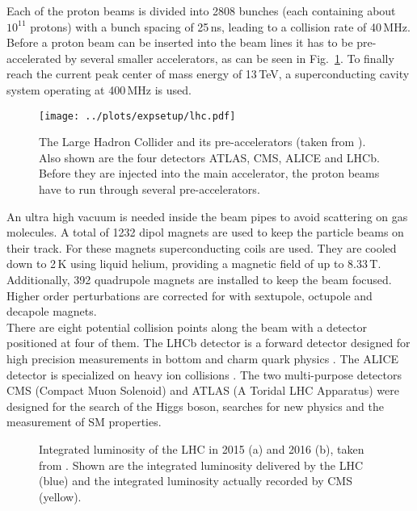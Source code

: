 \noindent Each of the proton beams is divided into 2808 bunches (each containing about $10^{11}$ protons) with a bunch spacing of 25\,ns, leading to a collision rate of 40\,MHz. Before a proton beam can be inserted into the beam lines it has to be pre-accelerated by several smaller accelerators, as can be seen in Fig.~\ref{fig:expsetup:lhc}. To finally reach the current peak center of mass energy of 13\,TeV, a superconducting cavity system operating at 400\,MHz is used.\\
\begin{figure}[t]
	\centering
	\texttt{[image: ../plots/expsetup/lhc.pdf]}
	\caption[The Large Hadron Collider]{The Large Hadron Collider and its pre-accelerators (taken from \cite{lhc_fig}). Also shown are the four detectors ATLAS, CMS, ALICE and LHCb. Before they are injected into the main accelerator, the proton beams have to run through several pre-accelerators.}
	\label{fig:expsetup:lhc}
\end{figure}

\noindent An ultra high vacuum is needed inside the beam pipes to avoid scattering on gas molecules. A total of 1232 dipol magnets are used to keep the particle beams on their track. For these magnets superconducting coils are used. They are cooled down to 2\,K using liquid helium, providing a magnetic field of up to 8.33\,T. Additionally, 392 quadrupole magnets are installed to keep the beam focused. Higher order perturbations are corrected for with sextupole, octupole and decapole magnets.\\

\noindent There are eight potential collision points along the beam with a detector positioned at four of them. The LHCb detector is a forward detector designed for high precision measurements in bottom and charm quark physics \cite{LHCB}. The ALICE detector is specialized on heavy ion collisions \cite{ALICE}. The two multi-purpose detectors CMS (Compact Muon Solenoid) and ATLAS (A Toridal LHC Apparatus) were designed for the search of the Higgs boson, searches for new physics and the measurement of SM properties.\\

\begin{figure}
	\centering
	\begin{minipage}{0.5\textwidth}
	\end{minipage}%
	\begin{minipage}{0.5\textwidth}
	\end{minipage}
	\caption[Integrated luminosity of the LHC in 2015 and 2016]{Integrated luminosity of the LHC in 2015 (a) and 2016 (b), taken from 	\cite{cmslumi}. Shown are the integrated luminosity delivered by the LHC (blue) and the integrated luminosity actually recorded by CMS (yellow).}
\end{figure}

